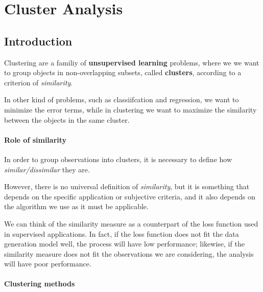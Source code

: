 \chapter{Cluster Analysis}
\section{Introduction}
Clustering are a familiy of \textbf{unsupervised learning} problems, where we we want to group objects in non-overlapping subsets, called \textbf{clusters}, according to a criterion of \textit{similarity}.

In other kind of problems, such as classiifcation and regression, we want to minimize the error terms, while in clustering we want to maximize the similarity between the objects in the same cluster.


\subsubsection*{Role of similarity}
In order to group observations into clusters, it is necessary to define how \textit{similar/dissimilar} they are.

However, there is no universal definition of \textit{similarity}, but it is something that depends on the specific application or subjective criteria, and it also depends on the algorithm we use as it must be applicable.

We can think of the similarity measure as a counterpart of the loss function used in supervised applications.
In fact, if the loss function does not fit the data generation model well, the process will have low performance; likewise, if the similarity measure does not fit the observations we are considering, the analysis will have poor performance.

\subsubsection*{Clustering methods}

